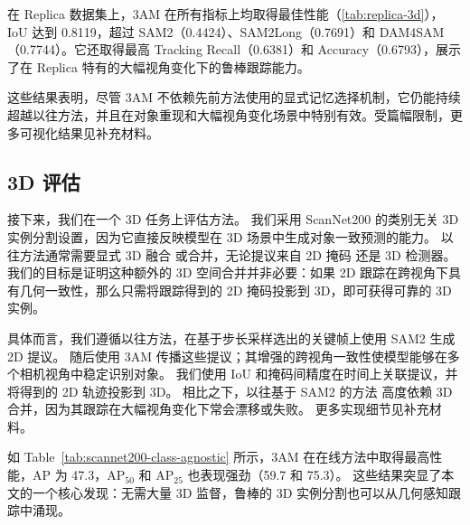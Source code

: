 在 Replica 数据集上，3AM 在所有指标上均取得最佳性能（\cref{tab:replica-3d}），IoU 达到 0.8119，超过 SAM2（0.4424）、SAM2Long（0.7691）和 DAM4SAM（0.7744）。它还取得最高 Tracking Recall（0.6381）和 Accuracy（0.6793），展示了在 Replica 特有的大幅视角变化下的鲁棒跟踪能力。

这些结果表明，尽管 3AM 不依赖先前方法使用的显式记忆选择机制，它仍能持续超越以往方法，并且在对象重现和大幅视角变化场景中特别有效。受篇幅限制，更多可视化结果见补充材料。


\vspace{-0.5em}
\subsection{3D 评估}
\vspace{-0.5em}

接下来，我们在一个 3D 任务上评估方法。
我们采用 ScanNet200 的类别无关 3D 实例分割设置，因为它直接反映模型在 3D 场景中生成对象一致预测的能力。
以往方法通常需要显式 3D 融合\cite{xu2024esam} 或合并\cite{yang2023sam3d}，无论提议来自 2D 掩码\cite{jung2025details} 还是 3D 检测器\cite{boudjoghra2025openyolo, nguyen2024open3dis}。
我们的目标是证明这种额外的 3D 空间合并并非必要：如果 2D 跟踪在跨视角下具有几何一致性，那么只需将跟踪得到的 2D 掩码投影到 3D，即可获得可靠的 3D 实例。

具体而言，我们遵循以往方法\cite{zhao2025sam2object}，在基于步长采样选出的关键帧上使用 SAM2 生成 2D 提议。
随后使用 3AM 传播这些提议；其增强的跨视角一致性使模型能够在多个相机视角中稳定识别对象。
我们使用 IoU 和掩码间精度在时间上关联提议，并将得到的 2D 轨迹投影到 3D。
相比之下，以往基于 SAM2 的方法\cite{zhao2025sam2object} 高度依赖 3D 合并，因为其跟踪在大幅视角变化下常会漂移或失败。
更多实现细节见补充材料。

如 Table~\ref{tab:scannet200-class-agnostic} 所示，3AM 在在线方法中取得最高性能，AP 为 47.3，AP$_{50}$ 和 AP$_{25}$ 也表现强劲（59.7 和 75.3）。
这些结果突显了本文的一个核心发现：无需大量 3D 监督，鲁棒的 3D 实例分割也可以从几何感知跟踪中涌现。



